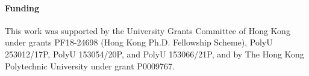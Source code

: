 \documentclass{article}
\numberwithin{equation}{section}
\theoremstyle{definition}
\theoremstyle{plain}
\theoremstyle{remark}
\begin{document}
\paragraph*{Funding}
This work was supported by the University Grants Committee of Hong Kong under grants PF18-24698 (Hong Kong Ph.D. Fellowship Scheme), PolyU 253012/17P, PolyU 153054/20P, and PolyU 153066/21P, and by The Hong Kong Polytechnic University under grant P0009767.



\end{document}
